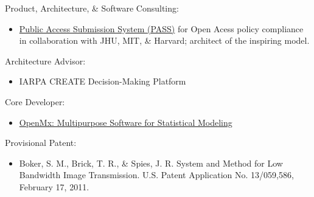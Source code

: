 \documentclass[11pt]{article}
\begin{document}
Product, Architecture, \& Software Consulting:
\begin{itemize}
	\item \href{https://github.com/oa-pass}{Public Access Submission System (PASS)} for Open Acess policy compliance in collaboration with JHU, MIT, \& Harvard; architect of the inspiring model.
\end{itemize}
	
Architecture Advisor:
\begin{itemize}
\item IARPA CREATE Decision-Making Platform
\end{itemize}

Core Developer:
\begin{itemize}
\item \href{http://openmx.psyc.virginia.edu}{OpenMx: Multipurpose Software for Statistical Modeling}
\end{itemize}

Provisional Patent:
\begin{itemize}
\item Boker, S. M., Brick, T. R., \& Spies, J. R. System and Method for Low Bandwidth Image Transmission. U.S. Patent Application No. 13/059,586, February 17, 2011.
\end{itemize}
\end{document}
